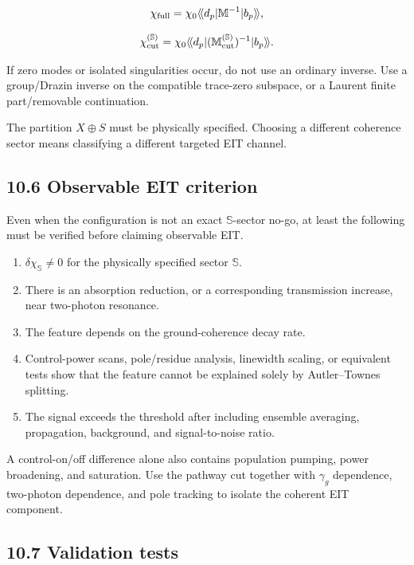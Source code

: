 \documentclass[
  10pt,
  a4paper,
]{article}
\providecommand{\tightlist}{%
  \setlength{\itemsep}{0pt}\setlength{\parskip}{0pt}}
\begin{document}
\[
\chi_{\rm full}
=\chi_0\langle\!\langle d_p|
\mathbb M^{-1}
|b_p\rangle\!\rangle,
\]

\[
\chi_{\rm cut}^{(\mathbb S)}
=\chi_0\langle\!\langle d_p|
(\mathbb M_{\rm cut}^{(\mathbb S)})^{-1}
|b_p\rangle\!\rangle.
\]

If zero modes or isolated singularities occur, do not use an ordinary
inverse. Use a group/Drazin inverse on the compatible trace-zero
subspace, or a Laurent finite part/removable continuation.

The partition \(X\oplus S\) must be physically specified. Choosing a
different coherence sector means classifying a different targeted EIT
channel.

\subsection{10.6 Observable EIT
criterion}\label{observable-eit-criterion}

Even when the configuration is not an exact \(\mathbb S\)-sector no-go,
at least the following must be verified before claiming observable EIT.

\begin{enumerate}
\def\labelenumi{\arabic{enumi}.}
\tightlist
\item
  \(\delta\chi_{\mathbb S}\neq0\) for the physically specified sector
  \(\mathbb S\).
\item
  There is an absorption reduction, or a corresponding transmission
  increase, near two-photon resonance.
\item
  The feature depends on the ground-coherence decay rate.
\item
  Control-power scans, pole/residue analysis, linewidth scaling, or
  equivalent tests show that the feature cannot be explained solely by
  Autler--Townes splitting.
\item
  The signal exceeds the threshold after including ensemble averaging,
  propagation, background, and signal-to-noise ratio.
\end{enumerate}

A control-on/off difference alone also contains population pumping,
power broadening, and saturation. Use the pathway cut together with
\(\gamma_g\) dependence, two-photon dependence, and pole tracking to
isolate the coherent EIT component.

\subsection{10.7 Validation tests}\label{validation-tests}
\end{document}
